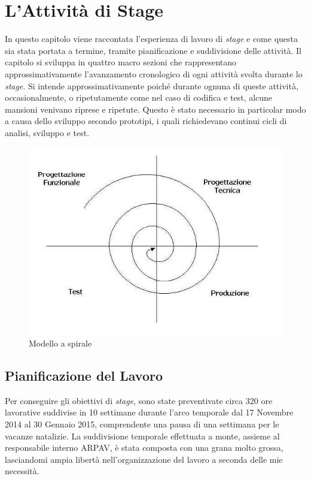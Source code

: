 \chapter{L'Attività di Stage}
\label{3.0}
\thispagestyle{fancy} 

In questo capitolo viene raccontata l'esperienza di lavoro di \textit{stage} e come questa sia stata portata a termine, tramite pianificazione e suddivisione delle attività. Il capitolo si sviluppa in quattro macro sezioni che rappresentano approssimativamente l'avanzamento cronologico di ogni attività svolta durante lo \textit{stage}. Si intende approssimativamente poiché durante ognuna di queste attività, occasionalmente, o ripetutamente come nel caso di codifica e test, alcune mansioni venivano riprese e ripetute. Questo è stato necessario in particolar modo a causa dello sviluppo secondo prototipi, i quali richiedevano continui cicli di analisi, sviluppo e test.
\begin{figure}[htbp]
\centering	
\includegraphics[width=.5\textwidth]{./capitoli/capitolo3/img/spirale}
\caption{Modello a spirale}

\end{figure}
\section{Pianificazione del Lavoro}


Per conseguire gli obiettivi di \textit{stage}, sono state preventivate circa 320 ore lavorative suddivise in 10 settimane durante l'arco temporale dal 17 Novembre 2014 al 30 Gennaio 2015, comprendente una pausa di una settimana per le vacanze natalizie. La suddivisione temporale effettuata a monte, assieme al responsabile interno ARPAV, è stata composta con una grana molto grossa, lasciandomi ampia libertà nell'organizzazione del lavoro a seconda delle mie necessità.

